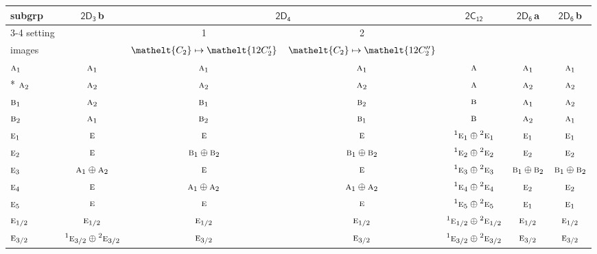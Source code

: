 \documentclass[10pt,a4paper]{article}
\numberwithin{equation}{section}
\newcommand{\eltfont}[1]{{\let\sigma\eltsigma\mathelt{#1}}}
\newcommand{\grp}[1]{\mathsf{#1}}
\newcommand{\irr}[1]{\text{\normalfont\scshape #1}}
\newcommand{\conjpair}[1]{{}^{#1}}
\newcommand{\cls}[1]{\eltfont{#1}}
\newcommand{\clsletter}[1]{\,{\scriptsize\color{black!55}#1}}
\begin{document}
{\small\begin{longtable}{@{}lcccccc@{}}\toprule
subgrp & \href{2D3.pdf}{$\grp{2D_{3}}$}\clsletter{b} & \multicolumn{2}{c}{\href{2D4.pdf}{$\grp{2D_{4}}$}} & \href{2C12.pdf}{$\grp{2C_{12}}$} & \href{2D6.pdf}{$\grp{2D_{6}}$}\clsletter{a} & \href{2D6.pdf}{$\grp{2D_{6}}$}\clsletter{b}\\\cmidrule(lr){3-4}
setting &  & 1 & 2 &  &  & \\
images &  & {\scriptsize $\cls{C_{2}} \mapsto \cls{12C_{2}'}$} & {\scriptsize $\cls{C_{2}} \mapsto \cls{12C_{2}''}$} &  &  & \\\midrule\endhead
\bottomrule\endfoot\endlastfoot
$\irr{a}_{1}$ & $\irr{a}_{1}$ & $\irr{a}_{1}$ & $\irr{a}_{1}$ & $\irr{a}$ & $\irr{a}_{1}$ & $\irr{a}_{1}$\\*
$\irr{a}_{2}$ & $\irr{a}_{2}$ & $\irr{a}_{2}$ & $\irr{a}_{2}$ & $\irr{a}$ & $\irr{a}_{2}$ & $\irr{a}_{2}$\\
$\irr{b}_{1}$ & $\irr{a}_{2}$ & $\irr{b}_{1}$ & $\irr{b}_{2}$ & $\irr{b}$ & $\irr{a}_{1}$ & $\irr{a}_{2}$\\
$\irr{b}_{2}$ & $\irr{a}_{1}$ & $\irr{b}_{2}$ & $\irr{b}_{1}$ & $\irr{b}$ & $\irr{a}_{2}$ & $\irr{a}_{1}$\\
$\irr{e}_{1}$ & $\irr{e}$ & $\irr{e}$ & $\irr{e}$ & $\conjpair{1}\irr{e}_{1}\oplus \conjpair{2}\irr{e}_{1}$ & $\irr{e}_{1}$ & $\irr{e}_{1}$\\
$\irr{e}_{2}$ & $\irr{e}$ & $\irr{b}_{1}\oplus \irr{b}_{2}$ & $\irr{b}_{1}\oplus \irr{b}_{2}$ & $\conjpair{1}\irr{e}_{2}\oplus \conjpair{2}\irr{e}_{2}$ & $\irr{e}_{2}$ & $\irr{e}_{2}$\\
$\irr{e}_{3}$ & $\irr{a}_{1}\oplus \irr{a}_{2}$ & $\irr{e}$ & $\irr{e}$ & $\conjpair{1}\irr{e}_{3}\oplus \conjpair{2}\irr{e}_{3}$ & $\irr{b}_{1}\oplus \irr{b}_{2}$ & $\irr{b}_{1}\oplus \irr{b}_{2}$\\
$\irr{e}_{4}$ & $\irr{e}$ & $\irr{a}_{1}\oplus \irr{a}_{2}$ & $\irr{a}_{1}\oplus \irr{a}_{2}$ & $\conjpair{1}\irr{e}_{4}\oplus \conjpair{2}\irr{e}_{4}$ & $\irr{e}_{2}$ & $\irr{e}_{2}$\\
$\irr{e}_{5}$ & $\irr{e}$ & $\irr{e}$ & $\irr{e}$ & $\conjpair{1}\irr{e}_{5}\oplus \conjpair{2}\irr{e}_{5}$ & $\irr{e}_{1}$ & $\irr{e}_{1}$\\
$\irr{e}_{1/2}$ & $\irr{e}_{1/2}$ & $\irr{e}_{1/2}$ & $\irr{e}_{1/2}$ & $\conjpair{1}\irr{e}_{1/2}\oplus \conjpair{2}\irr{e}_{1/2}$ & $\irr{e}_{1/2}$ & $\irr{e}_{1/2}$\\
$\irr{e}_{3/2}$ & $\conjpair{1}\irr{e}_{3/2}\oplus \conjpair{2}\irr{e}_{3/2}$ & $\irr{e}_{3/2}$ & $\irr{e}_{3/2}$ & $\conjpair{1}\irr{e}_{3/2}\oplus \conjpair{2}\irr{e}_{3/2}$ & $\irr{e}_{3/2}$ & $\irr{e}_{3/2}$\\

\end{longtable}}
\end{document}
